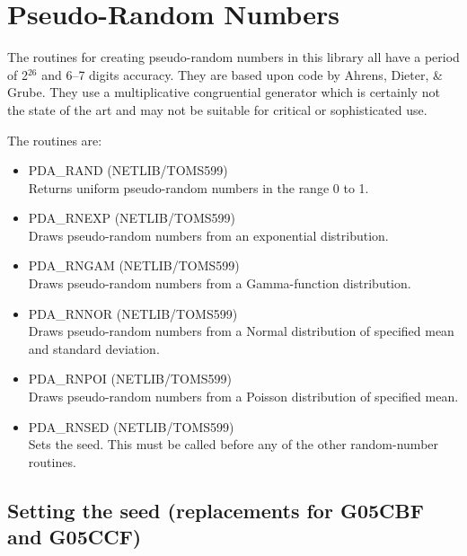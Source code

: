 \documentclass[11pt,twoside]{article}
\newcommand{\htmlref}[2]{#1}
\newcommand{\xlabel}[1]{}
\begin{document}
\section{\xlabel{pseudo-random_numbers}Pseudo-Random Numbers}

   The routines for creating pseudo-random numbers in this library all
   have a period of 2$^{26}$ and 6--7 digits accuracy.  They are based
   upon code by Ahrens, Dieter, \& Grube.  They use a multiplicative
   congruential generator which is certainly not the state of the art
   and may not be suitable for critical or sophisticated use.

The routines are:

\begin{itemize}

\item \htmlref{PDA\_RAND}{PDA\_RAND} (NETLIB/TOMS599)\ \\
   Returns uniform pseudo-random numbers in the range 0 to 1.

\item \htmlref{PDA\_RNEXP}{PDA\_RNEXP} (NETLIB/TOMS599)\ \\
   Draws pseudo-random numbers from an exponential distribution.

\item \htmlref{PDA\_RNGAM}{PDA\_RNGAM} (NETLIB/TOMS599)\ \\
   Draws pseudo-random numbers from a Gamma-function distribution.

\item \htmlref{PDA\_RNNOR}{PDA\_RNNOR} (NETLIB/TOMS599)\ \\
   Draws pseudo-random numbers from a Normal distribution of specified
   mean and standard deviation.

\item \htmlref{PDA\_RNPOI}{PDA\_RNPOI} (NETLIB/TOMS599)\ \\
   Draws pseudo-random numbers from a Poisson distribution of
   specified mean.

\item \htmlref{PDA\_RNSED}{PDA\_RNSED} (NETLIB/TOMS599)\ \\
   Sets the seed.  This must be called before any of the other
   random-number routines.

\end{itemize}

\subsection{\xlabel{setting_the_seed_replacements_for_g05cbf_and_g05ccf}Setting the seed (replacements for G05CBF and G05CCF)}
\label{se:seeding}
\end{document}
